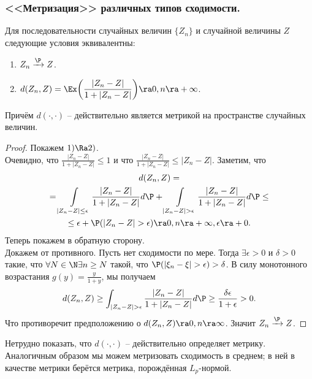 \subsubsection{<<Метризация>> различных типов сходимости.}
\begin{theorem}
    Для последовательности случайных величин $\{Z_n\}$ и случайной величины $Z$ следующие условия эквивалентны:
    \begin{enumerate}
        \item $Z_n \xrightarrow{\P} Z$.
        \item $d(Z_n, Z) = \Ex\biggr( \dfrac{|Z_n - Z|}{1 + |Z_n - Z|}\biggr) \ra 0, n \ra +\infty$.
    \end{enumerate}
    Причём $d(\cdot, \cdot)$ -- действительно является метрикой на пространстве случайных величин.
\end{theorem}
\begin{proof}
    Покажем $1) \Ra 2)$. \\
    Очевидно, что $\frac{|Z_n - Z|}{1 + |Z_n - Z|} \leq 1$ и что $\frac{|Z_n - Z|}{1 + |Z_n - Z|} \leq |Z_n - Z|$.
    Заметим, что
    \begin{multline*}
        d(Z_n, Z) = \\ = \int\limits_{|Z_n - Z| \leq \epsilon} \dfrac{|Z_n - Z|}{1 + |Z_n - Z|}d\P + \int\limits_{|Z_n - Z| > \epsilon} \dfrac{|Z_n - Z|}{1 + |Z_n - Z|}d\P \leq \\ \leq \epsilon + \P(|Z_n - Z| > \epsilon) \ra 0, n \ra +\infty, \epsilon \ra +0.
    \end{multline*}
    Теперь покажем в обратную сторону. \\
    Докажем от противного. Пусть нет сходимости по мере. Тогда $\exists \epsilon > 0$ и $\delta > 0$ такие, что $\forall N \in \N \exists n \geq N$ такой, что $\P(|\xi_n - \xi| > \epsilon) > \delta$.
    В силу монотонного возрастания $g(y) = \frac{y}{1 + y}$, мы получаем
    \[
        d(Z_n, Z) \geq \int_{|Z_n - Z| > \epsilon} \dfrac{|Z_n - Z|}{1 + |Z_n - Z|}d\P \geq \dfrac{\delta \epsilon}{1 + \epsilon} > 0.
    \]
    Что противоречит предположению о $d(Z_n, Z) \ra 0, n \ra \infty$.
    Значит $Z_n \xrightarrow{\P} Z$.
\end{proof}
\begin{note}
    Нетрудно показать, что $d(\cdot, \cdot)$ -- действительно определяет метрику. \\
    Аналогичным образом мы можем метризовать сходимость в среднем; в ней в качестве метрики берётся метрика, порождённая $L_p$-нормой.
\end{note}

